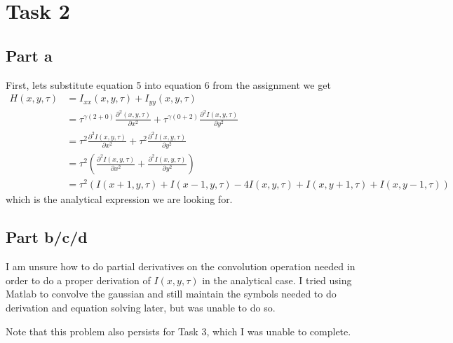 \section{Task 2}
\subsection{Part a}
First, lets substitute equation 5 into equation 6 from the assignment we get
\begin{align}
  H(x,y,\tau) &= I_{xx}(x,y,\tau) + I_{yy}(x,y,\tau) \\
              &= \tau^{\gamma(2+0)} \frac{\partial^2(x,y,\tau)}{\partial x^2} + \tau^{\gamma(0+2)}\frac{\partial^2I(x,y,\tau)}{\partial y^2} \\
              &= \tau^2 \frac{\partial^2I(x,y,\tau)}{\partial x^2} + \tau^2\frac{\partial^2I(x,y,\tau)}{\partial y^2} \\
              &= \tau^2 \left(\frac{\partial^2I(x,y,\tau)}{\partial x^2} + \frac{\partial^2I(x,y,\tau)}{\partial y^2}\right) \\
              &= \tau^2 \left( I(x+1,y,\tau )+I(x-1,y,\tau )-4I(x,y,\tau )+I(x,y+1,\tau )+I(x,y-1,\tau ) \right)
\end{align}
which is the analytical expression we are looking for.

\subsection{Part b/c/d}
I am unsure how to do partial derivatives on the convolution operation needed in order to do a proper
derivation of $I(x,y,\tau)$ in the analytical case. I tried using Matlab to convolve the gaussian and
still maintain the symbols needed to do derivation and equation solving later, but was unable to do so.

Note that this problem also persists for Task 3, which I was unable to complete.
